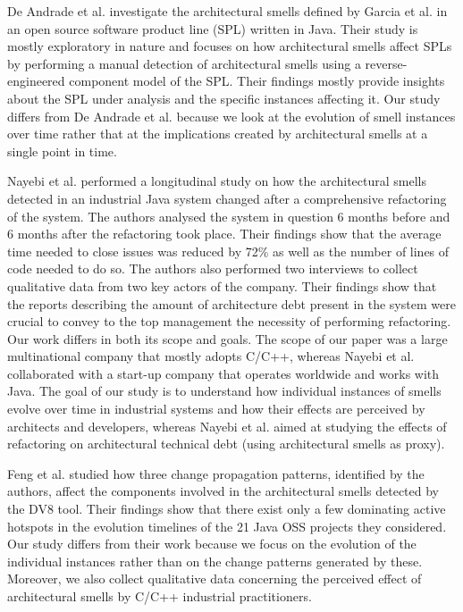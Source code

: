De Andrade et al. \cite{DeAndrade2014} investigate the architectural smells defined by Garcia et al. \cite{Garcia2009} in an open source software product line (SPL) written in Java.
Their study is mostly exploratory in nature and focuses on how architectural smells affect SPLs by performing a manual detection of architectural smells using a reverse-engineered component model of the SPL.
Their findings mostly provide insights about the SPL under analysis and the specific instances affecting it.
Our study differs from De Andrade et al. because we look at the evolution of smell instances over time rather that at the implications created by architectural smells at a single point in time.

Nayebi et al. \cite{Nayebi2019} performed a longitudinal study on how the architectural smells detected in an industrial Java system changed after a comprehensive refactoring of the system. 
The authors analysed the system in question 6 months before and 6 months after the refactoring took place.
Their findings show that the average time needed to close issues was reduced by 72\% as well as the number of lines of code needed to do so.
The authors also performed two interviews to collect qualitative data from two key actors of the company.
Their findings show that the reports describing the amount of architecture debt present in the system were crucial to convey to the top management the necessity of performing refactoring.
Our work differs in both its scope and goals.
The scope of our paper was a large multinational company that mostly adopts C/C++, whereas Nayebi et al. collaborated with a start-up company that operates worldwide and works with Java.
The goal of our study is to understand how individual instances of smells evolve over time in industrial systems and how their effects are perceived by architects and developers, whereas Nayebi et al. aimed at studying the effects of refactoring on architectural technical debt (using architectural smells as proxy).

Feng et al. \cite{Feng2019} studied how three change propagation patterns, identified by the authors, affect the components involved in the architectural smells detected by the DV8 tool. 
Their findings show that there exist only a few dominating active hotspots in the evolution timelines of the 21 Java OSS projects they considered.
Our study differs from their work because we focus on the evolution of the individual instances rather than on the change patterns generated by these.
Moreover, we also collect qualitative data concerning the perceived effect of architectural smells by C/C++ industrial practitioners.

